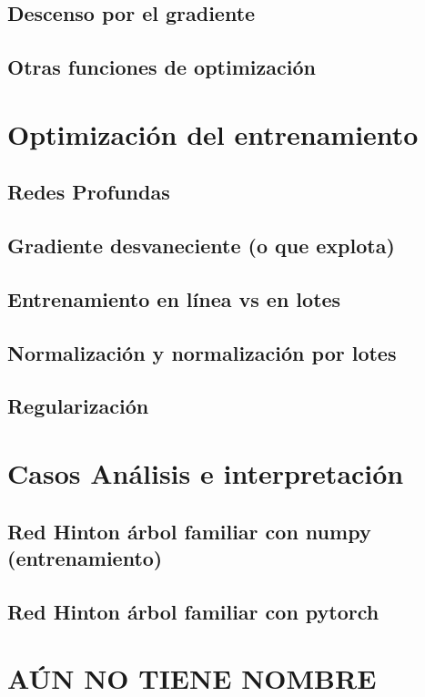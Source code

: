 \documentclass{article}
\begin{document}
\subsection{Descenso por el gradiente}
\subsection{Otras funciones de optimización}
\section{Optimización del entrenamiento} %
\subsection{Redes Profundas}
\subsection{Gradiente desvaneciente (o que explota) }
\newpage
\subsection{Entrenamiento en línea vs en lotes}

\subsection{Normalización y normalización por lotes}

\subsection{Regularización}
\section{Casos Análisis e interpretación}%

\subsection{Red Hinton árbol familiar con numpy (entrenamiento)}

\subsection{Red Hinton árbol familiar con pytorch}
\section{AÚN NO TIENE NOMBRE}%
\end{document}
